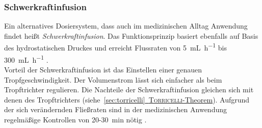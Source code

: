 \subsubsection*{Schwerkraftinfusion}
Ein alternatives Dosiersystem, dass auch im medizinischen Alltag Anwendung findet heißt \textit{Schwerkraftinfusion}. Das Funktionsprinzip basiert ebenfalls auf Basis des hydrostatischen Druckes und erreicht Flussraten von \SI{5}{\milli \liter \per \hour} bis \SI{300}{\milli \liter \per \hour} \cite{pfm_medical}.\\
Vorteil der Schwerkraftinfusion ist das Einstellen einer genauen Tropfgeschwindigkeit. Der Volumenstrom lässt sich einfacher als beim Tropftrichter regulieren. Die Nachteile der Schwerkraftinfusion gleichen sich mit denen des Tropftrichters \mbox{(siehe \hyperref[sec:torricelli]{\ref{sec:torricelli} \textsc{Torricelli}-Theorem})}. Aufgrund der sich verändernden Fließraten sind in der medizinischen Anwendung regelmäßige Kontrollen von 20-\SI{30}{\minute} nötig \cite{OnlinePortalfurprofessionellPflegende.06.03.2017}.


